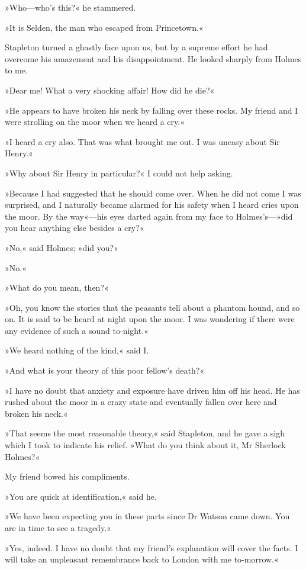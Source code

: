 »Who\allowbreak---\allowbreak who's this?« he stammered.

»It is Selden, the man who escaped from Princetown.«

Stapleton turned a ghastly face upon us, but by a supreme effort he had overcome his amazement and his disappointment. He looked sharply from Holmes to me.

»Dear me! What a very shocking affair! How did he die?«

»He appears to have broken his neck by falling over these rocks. My friend and I were strolling on the moor when we heard a cry.«

»I heard a cry also. That was what brought me out. I was uneasy about Sir Henry.«

»Why about Sir Henry in particular?« I could not help asking.

»Because I had suggested that he should come over. When he did not come I was surprised, and I naturally became alarmed for his safety when I heard cries upon the moor. By the way«\allowbreak---\allowbreak his eyes darted again from my face to Holmes's\allowbreak---\allowbreak  »did you hear anything else besides a cry?«

»No,« said Holmes; »did you?«

»No.«

»What do you mean, then?«

»Oh, you know the stories that the peasants tell about a phantom hound, and so on. It is said to be heard at night upon the moor. I was wondering if there were any evidence of such a sound to-night.«

»We heard nothing of the kind,« said I.

»And what is your theory of this poor fellow's death?«

»I have no doubt that anxiety and exposure have driven him off his head. He has rushed about the moor in a crazy state and eventually fallen over here and broken his neck.«

»That seems the most reasonable theory,« said Stapleton, and he gave a sigh which I took to indicate his relief. »What do you think about it, Mr Sherlock Holmes?«

My friend bowed his compliments.

»You are quick at identification,« said he.

»We have been expecting you in these parts since Dr Watson came down. You are in time to see a tragedy.«

»Yes, indeed. I have no doubt that my friend's explanation will cover the facts. I will take an unpleasant remembrance back to London with me to-morrow.«

